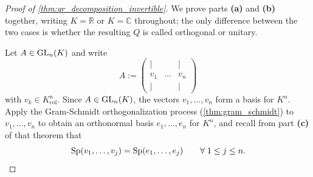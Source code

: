 \begin{proof}[Proof of \cref{thm:qr_decomposition_invertible}]
We prove parts \textbf{(a)} and \textbf{(b)} together, writing $K = \mathbb{R}$ or $K = \mathbb{C}$ throughout; the only difference between the two cases is whether the resulting $Q$ is called orthogonal or unitary.

Let $A \in \operatorname{GL}_n(K)$ and write
\[
    A := \begin{pmatrix} | & & | \\ v_1 & \dots & v_n \\ | & & | \end{pmatrix}
\]
with $v_k \in K_{\text{col}}^n$. Since $A \in \operatorname{GL}_n(K)$, the vectors $v_1, \dots, v_n$ form a basis for $K^n$. Apply the Gram-Schmidt orthogonalization process (\cref{thm:gram_schmidt}) to $v_1, \dots, v_n$ to obtain an orthonormal basis $e_1, \dots, e_n$ for $K^n$, and recall from part \textbf{(c)} of that theorem that
\begin{equation} \label{eq:qr_nested_spans}
    \operatorname{Sp}(v_1, \dots, v_j) = \operatorname{Sp}(e_1, \dots, e_j) \qquad \forall \; 1 \le j \le n.
\end{equation}


\end{proof}
